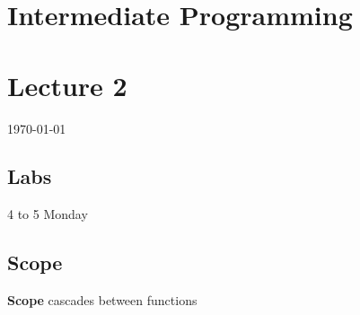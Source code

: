 \documentclass[12pt]{article}
\begin{document}
{\centering
\section*{Intermediate Programming}
\section*{Lecture 2}
\indent\today
}

\subsection*{Labs}
4 to 5 Monday
\subsection*{Scope}
\textbf{Scope} cascades between functions
\end{document}
